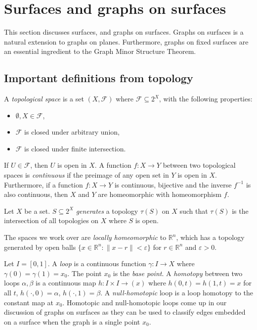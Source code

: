 \section{Surfaces and graphs on surfaces}
This section discusses surfaces, and graphs on surfaces. Graphs on surfaces is a natural extension to graphs on planes. Furthermore, graphs on fixed surfaces are an essential ingredient to the Graph Minor Structure Theorem.

\subsection{Important definitions from topology}
A \textit{topological space} is a set $(X, \mathcal{F})$ where $\mathcal{F} \subseteq 2^X$, with the following properties:
\begin{itemize}
    \item $\emptyset, X \in \mathcal{F}$,
    \item $\mathcal{F}$ is closed under arbitrary union,
    \item $\mathcal{F}$ is closed under finite intersection.
\end{itemize} 
If $U \in \mathcal{F}$, then $U$ is open in $X$. A function $f : X \rightarrow Y$ between two topological spaces is \textit{continuous} if the preimage of any open set in $Y$ is open in $X$. Furthermore, if a function $f : X \rightarrow Y$ is continuous, bijective and the inverse $f^{-1}$ is also continuous, then $X$ and $Y$ are homeomorphic with homeomorphism $f$. 

Let $X$ be a set. $S \subseteq 2^X$ \textit{generates} a topology $\tau(S)$ on $X$ such that $\tau(S)$ is the intersection of all topologies on $X$ where $S$ is open. 

The spaces we work over are \textit{locally homeomorphic} to $\mathbb{R}^n$, which has a topology generated by open balls $\{x \in \mathbb{R}^n: \| x - r \| < \varepsilon\}$ for $r \in \mathbb{R}^n$ and $\varepsilon > 0$.

Let $I = [0, 1]$.
A \textit{loop} is a continuous function $\gamma : I \rightarrow X$ where $\gamma(0) = \gamma(1) = x_0$. The point $x_0$ is the \textit{base point}. A \textit{homotopy} between two loops $\alpha, \beta$ is a continuous map $h : I \times I \rightarrow (x)$ where $h(0, t) = h(1, t) = x$ for all $t$, $h(\cdot, 0) = \alpha$, $h(\cdot, 1) = \beta$. A \textit{null-homotopic} loop is a loop homotopy to the constant map at $x_0$. Homotopic and null-homotopic loops come up in our discussion of graphs on surfaces as they can be used to classify edges embedded on a surface when the graph is a single point $x_0$. 


